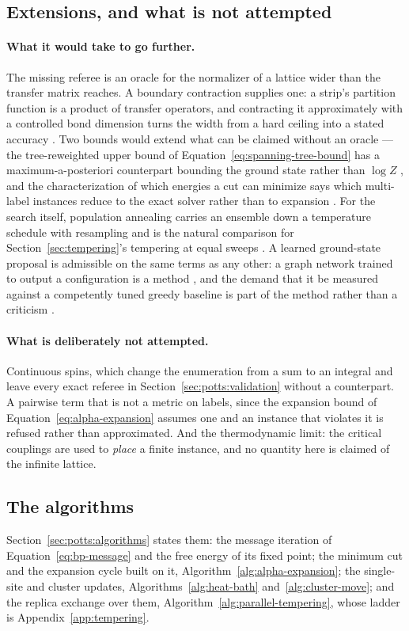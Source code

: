 \documentclass[11pt,a4paper]{article}
\begin{document}
\subsection{Extensions, and what is not attempted}
\label{sec:potts:extensions}
\paragraph{What it would take to go further.}
The missing referee is an oracle for the normalizer of a lattice wider than the
transfer matrix reaches. A boundary contraction supplies one: a strip's
partition function is a product of transfer operators, and contracting it
approximately with a controlled bond dimension turns the width from a hard
ceiling into a stated accuracy \citep{schollwoeck2011}. Two bounds would extend
what can be claimed without an oracle --- the tree-reweighted upper bound of
Equation~\ref{eq:spanning-tree-bound} has a maximum-a-posteriori counterpart
bounding the ground state rather than $\log Z$ \citep{wainwright2005map}, and
the characterization of which energies a cut can minimize says which
multi-label instances reduce to the exact solver rather than to expansion
\citep{kolmogorov2004}. For the search itself, population annealing carries an
ensemble down a temperature schedule with resampling and is the natural
comparison for Section~\ref{sec:tempering}'s tempering at equal sweeps
\citep{machta2010}. A learned ground-state proposal is admissible on the same
terms as any other: a graph network trained to output a configuration is a
method \citep{schuetz2022}, and the demand that it be measured against a
competently tuned greedy baseline is part of the method rather than a criticism
\citep{angelini2023}.

\paragraph{What is deliberately not attempted.}
Continuous spins, which change the enumeration from a sum to an integral and
leave every exact referee in Section~\ref{sec:potts:validation} without a
counterpart. A pairwise term that is not a metric on labels, since the
expansion bound of Equation~\ref{eq:alpha-expansion} assumes one and an
instance that violates it is refused rather than approximated. And the
thermodynamic limit: the critical couplings are used to \emph{place} a finite
instance, and no quantity here is claimed of the infinite lattice.

\subsection{The algorithms}
Section~\ref{sec:potts:algorithms} states them: the message
iteration of Equation~\ref{eq:bp-message} and the free energy of its fixed
point; the minimum cut and the expansion cycle built on it,
Algorithm~\ref{alg:alpha-expansion}; the single-site and cluster updates,
Algorithms~\ref{alg:heat-bath} and~\ref{alg:cluster-move}; and the replica
exchange over them, Algorithm~\ref{alg:parallel-tempering}, whose ladder is
Appendix~\ref{app:tempering}.
\end{document}

